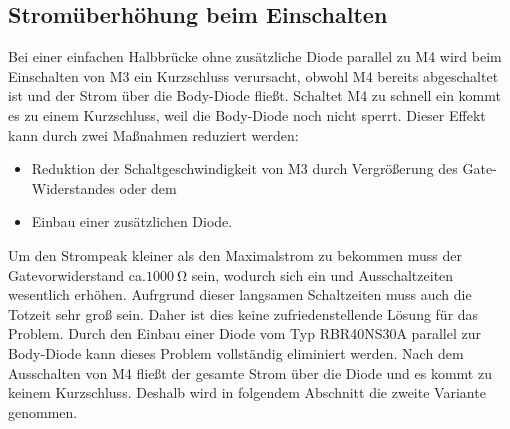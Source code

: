 \subsection{Stromüberhöhung beim Einschalten}
Bei einer einfachen Halbbrücke ohne zusätzliche Diode parallel zu M4 wird beim Einschalten von M3 ein Kurzschluss verursacht, obwohl M4 bereits abgeschaltet ist und der Strom über die Body-Diode fließt. Schaltet M4 zu schnell ein kommt es zu einem Kurzschluss, weil die Body-Diode noch nicht sperrt.
Dieser Effekt kann durch zwei Maßnahmen reduziert werden:
\begin{itemize}
    \item Reduktion der Schaltgeschwindigkeit von M3 durch Vergrößerung des Gate-Widerstandes oder dem
    \item Einbau einer zusätzlichen Diode.
\end{itemize}
Um den Strompeak kleiner als den Maximalstrom zu bekommen muss der Gatevorwiderstand ca.$\SI{1000}{\ohm}$ sein, wodurch sich ein und Ausschaltzeiten wesentlich erhöhen. Aufrgrund dieser langsamen Schaltzeiten muss auch die Totzeit sehr groß sein. Daher ist dies keine zufriedenstellende Lösung für das Problem.
Durch den Einbau einer Diode vom Typ RBR40NS30A parallel zur Body-Diode kann dieses Problem vollständig eliminiert werden. Nach dem Ausschalten von M4 fließt der gesamte Strom über die Diode und es kommt zu keinem Kurzschluss. Deshalb wird in folgendem Abschnitt die zweite Variante genommen.
